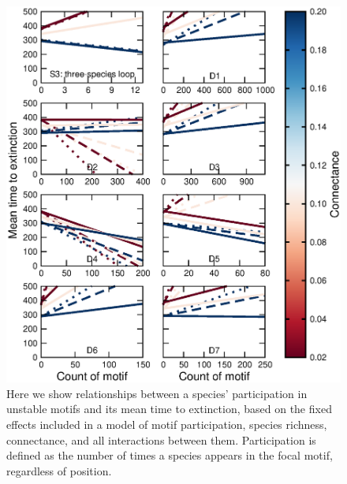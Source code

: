 \documentclass[12pt]{article}
\begin{document}
	\begin{figure}[h!]
		\caption{Here we show relationships between a species' participation in unstable motifs and its mean time to extinction, based on the fixed effects included in a model of motif participation, species richness, connectance, and all interactions between them. Participation is defined as the number of times a species appears in the focal motif, regardless of position.}
		\label{proportion_fig}
		\includegraphics[width=\textwidth]{figures/extinction_order/unstable_motif_lmer_summary_paper_full.eps}
		\end{figure}
		
\end{document}
